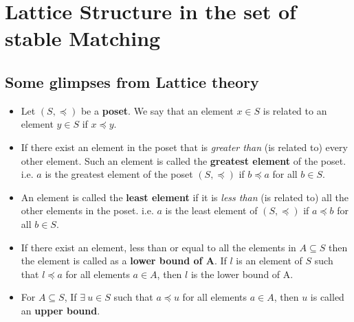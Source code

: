 \section{Lattice Structure in the set of stable Matching}

\subsection{Some glimpses from Lattice theory}
    \begin{itemize}
        \item Let $(S,\preceq)$ be a \textbf{poset}. We say that an element $x \in S$ is related to an element $y \in S$ if $x \preceq y$.
         
        \item If there exist an element in the poset that is \textit{greater than} (is related to) every other element. Such an element is called the \textbf{greatest element} of the poset. i.e. $a$ is the greatest element of the poset $(S,\preceq)$ if $b \preceq a$ for all $b \in S$.
         
        \item An element is called the \textbf{least element} if it is \textit{less than} (is related to) all the other elements in the poset. i.e. $a$ is the least element of $(S, \preceq)$ if $a \preceq b$ for all $b \in S$.
         
        \item If there exist an element, less than or equal to all the elements in $A \subseteq S$ then the element is called as a \textbf{lower bound of A}. If $l$ is an element of $S$ such that $l \preceq a$ for all elements $a \in A$, then $l$ is the lower bound of A.
         
        \item For $A \subseteq S$, If  $\exists\:u \in S$ such that $a \preceq u$ for all elements $a \in A$, then $u$ is called an \textbf{upper bound}.
    \end{itemize}

